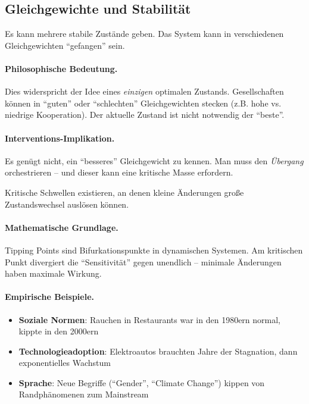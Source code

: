 \subsection{Gleichgewichte und Stabilität}

\begin{axiom}
Es kann mehrere stabile Zustände geben. Das System kann in verschiedenen Gleichgewichten ``gefangen'' sein.

\paragraph{Philosophische Bedeutung.}
Dies widerspricht der Idee eines \textit{einzigen} optimalen Zustands. Gesellschaften können in ``guten'' oder ``schlechten'' Gleichgewichten stecken (z.B. hohe vs. niedrige Kooperation). Der aktuelle Zustand ist nicht notwendig der ``beste''.

\paragraph{Interventions-Implikation.}
Es genügt nicht, ein ``besseres'' Gleichgewicht zu kennen. Man muss den \textit{Übergang} orchestrieren -- und dieser kann eine kritische Masse erfordern.
\end{axiom}

\begin{axiom}
Kritische Schwellen existieren, an denen kleine Änderungen große Zustandswechsel auslösen können.

\paragraph{Mathematische Grundlage.}
Tipping Points sind Bifurkationspunkte in dynamischen Systemen. Am kritischen Punkt divergiert die ``Sensitivität'' gegen unendlich -- minimale Änderungen haben maximale Wirkung.

\paragraph{Empirische Beispiele.}
\begin{itemize}
    \item \textbf{Soziale Normen}: Rauchen in Restaurants war in den 1980ern normal, kippte in den 2000ern
    \item \textbf{Technologieadoption}: Elektroautos brauchten Jahre der Stagnation, dann exponentielles Wachstum
    \item \textbf{Sprache}: Neue Begriffe (``Gender'', ``Climate Change'') kippen von Randphänomenen zum Mainstream
\end{itemize}
\end{axiom}

